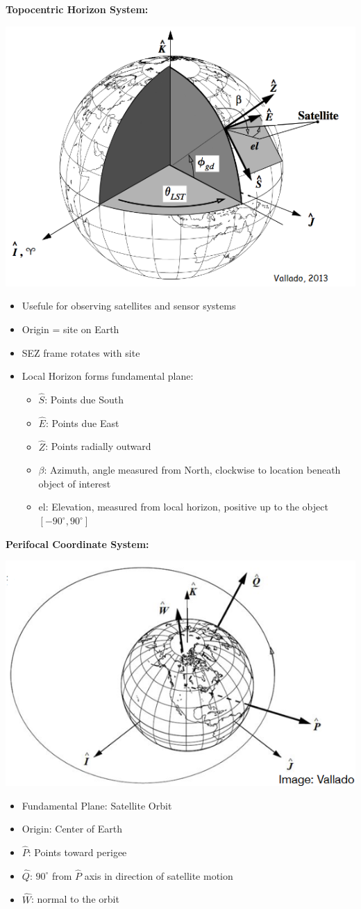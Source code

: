 \documentclass{article}
\begin{document}
\begin{multicols*}{3}
    \textbf{Topocentric Horizon System:}\par 
    \includegraphics[width=0.5\linewidth]{Figures/SEZ.png}
    \begin{itemize}
        \item Usefule for observing satellites and sensor systems
        \item Origin = site on Earth
        \item SEZ frame rotates with site
        \item Local Horizon forms fundamental plane:
            \begin{itemize}
                \item $\hat{S}$: Points due South
                \item $\hat{E}$: Points due East
                \item $\hat{Z}$: Points radially outward
                \item $\beta$: Azimuth, angle measured from North, clockwise to location beneath object of interest
                \item el: Elevation, measured from local horizon, positive up to the object $[-90^\circ,90^\circ]$
            \end{itemize}
    \end{itemize}

    \textbf{Perifocal Coordinate System:}\par 
    \includegraphics[width=0.5\linewidth]{Figures/perifocal_orbit.png}
    \begin{itemize}
        \item Fundamental Plane: Satellite Orbit
        \item Origin: Center of Earth
        \item $\hat{P}$: Points toward perigee
        \item $\hat{Q}$: $90^\circ$ from $\hat{P}$ axis in direction of satellite motion
        \item $\hat{W}$: normal to the orbit 
    \end{itemize}


\end{multicols*}
\end{document}
